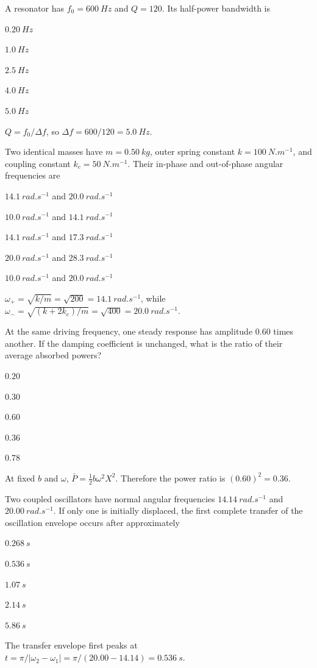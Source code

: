 \documentclass[10pt,a4paper,full]{physicsquiz}
\newcommand{\bankq}[9]{%
  \begin{quizquestion}[
    id=#1,
    topic={#2},
    difficulty=#3,
    marks=1,
    correct=#4,
    tags={#5},
    outcome={#6}
  ]
    #7
    \begin{choiceoptions}
      #8
    \end{choiceoptions}
  \end{quizquestion}
  \begin{quizsolution}
    #9
  \end{quizsolution}
}
\begin{document}
\begin{quizbank}
\bankq{coupled-030}{Coupled SHM, Q, and Power Response}{applied}{E}{quality-factor,bandwidth}{Calculate resonance bandwidth.}{%
A resonator has \(f_0=\SI{600}{Hz}\) and \(Q=120\). Its half-power bandwidth is}{%
\item \(\SI{0.20}{Hz}\)
\item \(\SI{1.0}{Hz}\)
\item \(\SI{2.5}{Hz}\)
\item \(\SI{4.0}{Hz}\)
\item \(\SI{5.0}{Hz}\)}{%
\(Q=f_0/\Delta f\), so \(\Delta f=600/120=\SI{5.0}{Hz}\).}

\bankq{coupled-031}{Coupled SHM, Q, and Power Response}{applied}{A}{coupling,normal-frequency}{Calculate coupled-oscillator frequencies.}{%
Two identical masses have \(m=\SI{0.50}{kg}\), outer spring constant \(k=\SI{100}{N.m^{-1}}\), and coupling constant \(k_c=\SI{50}{N.m^{-1}}\). Their in-phase and out-of-phase angular frequencies are}{%
\item \(\SI{14.1}{rad.s^{-1}}\) and \(\SI{20.0}{rad.s^{-1}}\)
\item \(\SI{10.0}{rad.s^{-1}}\) and \(\SI{14.1}{rad.s^{-1}}\)
\item \(\SI{14.1}{rad.s^{-1}}\) and \(\SI{17.3}{rad.s^{-1}}\)
\item \(\SI{20.0}{rad.s^{-1}}\) and \(\SI{28.3}{rad.s^{-1}}\)
\item \(\SI{10.0}{rad.s^{-1}}\) and \(\SI{20.0}{rad.s^{-1}}\)}{%
\(\omega_+=\sqrt{k/m}=\sqrt{200}=\SI{14.1}{rad.s^{-1}}\), while \(\omega_-=\sqrt{(k+2k_c)/m}=\sqrt{400}=\SI{20.0}{rad.s^{-1}}\).}

\bankq{coupled-032}{Coupled SHM, Q, and Power Response}{applied}{D}{power,response,numerical}{Compare absorbed powers at one frequency.}{%
At the same driving frequency, one steady response has amplitude \(0.60\) times another. If the damping coefficient is unchanged, what is the ratio of their average absorbed powers?}{%
\item \(0.20\)
\item \(0.30\)
\item \(0.60\)
\item \(0.36\)
\item \(0.78\)}{%
At fixed \(b\) and \(\omega\), \(\bar P=\tfrac12b\omega^2X^2\). Therefore the power ratio is \((0.60)^2=0.36\).}

\bankq{coupled-033}{Coupled SHM, Q, and Power Response}{challenge}{B}{coupling,energy-transfer}{Calculate the first envelope-transfer time.}{%
Two coupled oscillators have normal angular frequencies \(\SI{14.14}{rad.s^{-1}}\) and \(\SI{20.00}{rad.s^{-1}}\). If only one is initially displaced, the first complete transfer of the oscillation envelope occurs after approximately}{%
\item \(\SI{0.268}{s}\)
\item \(\SI{0.536}{s}\)
\item \(\SI{1.07}{s}\)
\item \(\SI{2.14}{s}\)
\item \(\SI{5.86}{s}\)}{%
The transfer envelope first peaks at \(t=\pi/|\omega_2-\omega_1|=\pi/(20.00-14.14)=\SI{0.536}{s}\).}


\end{quizbank}
\end{document}
